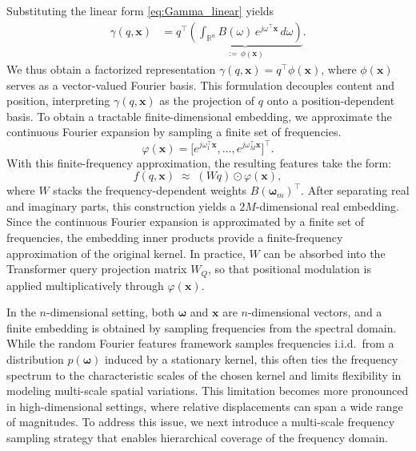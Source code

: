 \documentclass{article}
\theoremstyle{plain}
\theoremstyle{definition}
\theoremstyle{remark}
\begin{document}
Substituting the linear form \eqref{eq:Gamma_linear} yields
\begin{align}
    \gamma(q,\mathbf{x}) 
    &= q^{\!\top}\!\underbrace{\left(\int_{\mathbb{R}^n} B(\omega)\,e^{j\omega^\top \mathbf{x}}\,d\omega\right)}_{:=\,\phi(\mathbf{x})}.
\end{align}
We thus obtain a factorized representation $\gamma(q,\mathbf{x}) = q^{\top}\phi(\mathbf{x})$, where $\phi(\mathbf{x})$ serves as a vector-valued Fourier basis. This formulation decouples content and position, interpreting $\gamma(q,\mathbf{x})$ as the projection of $q$ onto a position-dependent basis. To obtain a tractable finite-dimensional embedding, we approximate the continuous Fourier expansion by sampling a finite set of frequencies.
\begin{equation}
\varphi(\mathbf{x}) = \big[e^{j\omega_1^\top \mathbf{x}}, \ldots, e^{j\omega_M^\top \mathbf{x}}\big]^\top .
\end{equation}
With this finite-frequency approximation, the resulting features take the form:
\begin{equation}
f(q,\mathbf{x}) \;\approx\; (W q) \odot \varphi(\mathbf{x}),
\end{equation}
where $W$ stacks the frequency-dependent weights $B(\boldsymbol{\omega}_m)^\top$. After separating real and imaginary parts, this construction yields a $2M$-dimensional real embedding. Since the continuous Fourier expansion is approximated by a finite set of frequencies, the embedding inner products provide a finite-frequency approximation of the original kernel. In practice, $W$ can be absorbed into the Transformer query projection matrix $W_Q$, so that positional modulation is applied multiplicatively through $\varphi(\mathbf{x})$.

In the $n$-dimensional setting, both $\boldsymbol{\omega}$ and $\mathbf{x}$ are $n$-dimensional vectors, and a finite embedding is obtained by sampling frequencies from the spectral domain. While the random Fourier features framework samples frequencies i.i.d.\ from a distribution $p(\boldsymbol{\omega})$ induced by a stationary kernel, this often ties the frequency spectrum to the characteristic scales of the chosen kernel and limits flexibility in modeling multi-scale spatial variations. This limitation becomes more pronounced in high-dimensional settings, where relative displacements can span a wide range of magnitudes. To address this issue, we next introduce a multi-scale frequency sampling strategy that enables hierarchical coverage of the frequency domain.
\end{document}

